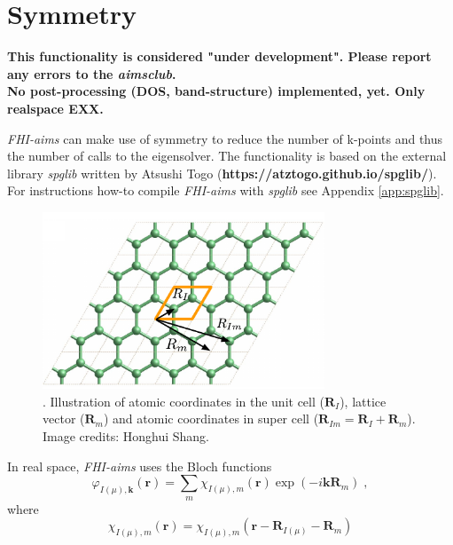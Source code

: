 \section{Symmetry}
\label{sec:symmetry}
\begin{center}
\begin{large}
 \textbf{This functionality is considered "under development". Please report any errors to the \textit{aimsclub}.\\ No post-processing (DOS, band-structure) implemented, yet. Only realspace EXX.}
\end{large}
\end{center}

\textit{FHI-aims} can make use of symmetry to reduce the number of k-points and thus the number of calls to the eigensolver. The functionality is based on the external library \textit{spglib} written by Atsushi Togo (\textbf{https://atztogo.github.io/spglib/}). For instructions how-to compile \textit{FHI-aims} with \textit{spglib} see Appendix \ref{app:spglib}.\\
\begin{figure}
\centering
\includegraphics[width=0.75\textwidth]{lattice.pdf}
\caption{\label{fig1}. Illustration of atomic coordinates in the unit cell ($\mathbf{R}_{I}$), lattice vector ($\mathbf{R}_m$) and atomic coordinates in super cell ($\mathbf{R}_{Im}=\mathbf{R}_{I}+\mathbf{R}_m$). Image credits: Honghui Shang.}
\end{figure}
In real space, {\it FHI-aims} uses the Bloch functions
\begin{equation}
 \varphi_{I(\mu),\mathbf{k}}(\mathbf{r})=\sum_m\chi_{I(\mu),m}(\mathbf{r})\exp(-i\mathbf{k}\mathbf{R}_m) \;,
 \label{Bloch}
\end{equation}
where
\begin{equation}
\chi_{I(\mu),m}(\mathbf{r})=\chi_{I(\mu),m}(\mathbf{r}-\mathbf{R}_{I(\mu)}-\mathbf{R}_m)\label{localbase}
\end{equation}
